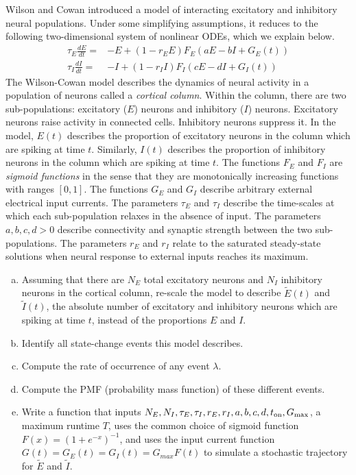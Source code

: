\begin{exercises}
\item \label{ex:hw_wilson_cowan}
Wilson and Cowan \cite{wilson1972excitatory,wilson1973mathematical} introduced a model of interacting excitatory and inhibitory neural populations. Under some simplifying assumptions, it reduces to the following two-dimensional system of nonlinear ODEs, which we explain below.
\begin{align*}
\tau_E \frac{dE}{dt} =& -E + (1-r_E E)F_E\left(aE - bI + G_E(t)\right)\\
\tau_I \frac{dI}{dt} =& -I + (1-r_I I)F_I\left(cE - dI + G_I(t)\right)
\end{align*}
The Wilson-Cowan model describes the dynamics of neural activity in a population of neurons called a \textit{cortical column}. Within the column, there are two sub-populations: excitatory ($E$) neurons and inhibitory ($I$) neurons. Excitatory neurons raise activity in connected cells. Inhibitory neurons suppress it. In the model, $E(t)$ describes the proportion of excitatory neurons in the column which are spiking at time $t$. Similarly, $I(t)$ describes the proportion of inhibitory neurons in the column which are spiking at time $t$. The functions $F_E$ and $F_I$ are \textit{sigmoid functions} in the sense that they are monotonically increasing functions with ranges $[0, 1]$. The functions $G_E$ and $G_I$ describe arbitrary external electrical input currents. The parameters $\tau_E$ and $\tau_I$ describe the time-scales at which each sub-population relaxes in the absence of input. The parameters $a, b, c, d > 0$ describe connectivity and synaptic strength between the two sub-populations. The parameters $r_E$ and $r_I$ relate to the saturated steady-state solutions when neural response to external inputs reaches its maximum.
\begin{enumerate}[(a)]
\item Assuming that there are $N_E$ total excitatory neurons and $N_I$ inhibitory neurons in the cortical column, re-scale the model to describe $\widetilde{E}(t)$ and $\widetilde{I}(t)$, the absolute number of excitatory and inhibitory neurons which are spiking at time $t$, instead of the proportions $E$ and $I$.
\item Identify all state-change events this model describes.
\item Compute the rate of occurrence of any event $\lambda$.
\item Compute the PMF (probability mass function) of these different events.
\item Write a function that inputs $N_E, N_I, \tau_E, \tau_I, r_E, r_I, a, b, c, d, t_{\textup{on}}, G_{\textup{max}}$, a maximum runtime $T$, uses the common choice of sigmoid function $F(x) = (1+e^{-x})^{-1}$, and uses the input current function $G(t) = G_E(t) = G_I(t) = G_{max}F(t)$ to simulate a stochastic trajectory for $\widetilde{E}$ and $\widetilde{I}$.

\end{enumerate}
\end{exercises}
